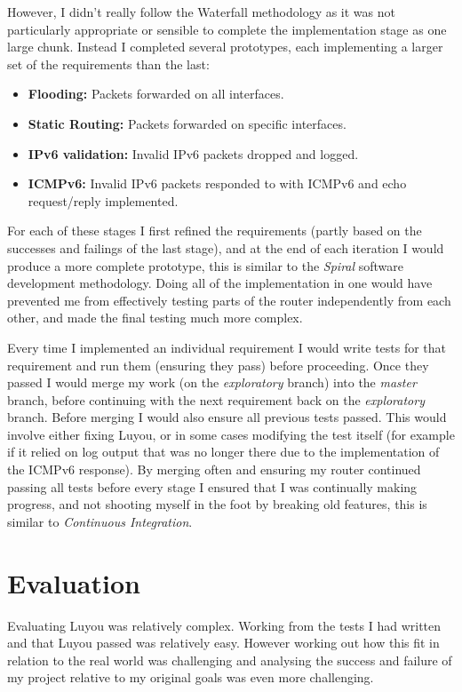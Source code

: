 \documentclass[12pt,a4paper,twoside,openright]{report}
\begin{document}
\bigskip

However, I didn't really follow the Waterfall methodology as it was not particularly appropriate or sensible to complete the implementation stage as one large chunk.  Instead I completed several prototypes, each implementing a larger set of the requirements than the last:
\begin{itemize}
\item \textbf{Flooding:} Packets forwarded on all interfaces.
\item \textbf{Static Routing:} Packets forwarded on specific interfaces.
\item \textbf{IPv6 validation:} Invalid IPv6 packets dropped and logged.
\item \textbf{ICMPv6:} Invalid IPv6 packets responded to with ICMPv6 and echo request/reply implemented.
\end{itemize}
For each of these stages I first refined the requirements (partly based on the successes and failings of the last stage), and at the end of each iteration I would produce a more complete prototype, this is similar to the \textit{Spiral} software development methodology. Doing all of the implementation in one would have prevented me from effectively testing parts of the router independently from each other, and made the final testing much more complex.

\bigskip

Every time I implemented an individual requirement I would write tests for that requirement and run them (ensuring they pass) before proceeding.  Once they passed I would merge my work (on the \textit{exploratory} branch) into the \textit{master} branch, before continuing with the next requirement back on the \textit{exploratory} branch.  Before merging I would also ensure all previous tests passed.  This would involve either fixing Luyou, or in some cases modifying the test itself (for example if it relied on log output that was no longer there due to the implementation of the ICMPv6 response).  By merging often and ensuring my router continued passing all tests before every stage I ensured that I was continually making progress, and not shooting myself in the foot by breaking old features, this is similar to \textit{Continuous Integration}.

\chapter{Evaluation}

Evaluating Luyou was relatively complex. Working from the tests I had written and that Luyou passed was relatively easy.  However working out how this fit in relation to the real world was challenging and analysing the success and failure of my project relative to my original goals was even more challenging.
\end{document}
